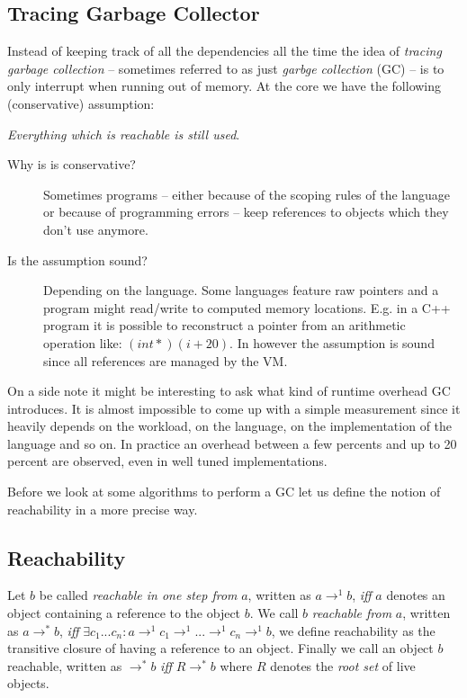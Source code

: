 \subsection{Tracing Garbage Collector}

Instead of keeping track of all the dependencies all the time the idea of \emph{tracing garbage collection} -- sometimes referred to as just \emph{garbge collection} (GC) -- is to only interrupt when running out of memory. At the core we have the following (conservative) assumption:

\emph{Everything which is reachable is still used}.

\begin{description}
  \item[Why is is conservative?] Sometimes programs -- either because of the scoping rules of the language or because of programming errors -- keep references to objects which they don't use anymore.
  \item[Is the assumption sound?] Depending on the language. Some languages feature raw pointers and a program might read/write to computed memory locations. E.g. in a C++ program it is possible to reconstruct a pointer from an arithmetic operation like: $(int*)(i+20)$. In \rift however the assumption is sound since all references are managed by the VM.
\end{description}

On a side note it might be interesting to ask what kind of runtime overhead GC introduces. It is almost impossible to come up with a simple measurement since it heavily depends on the workload, on the language, on the implementation of the language and so on. In practice an overhead between a few percents and up to 20 percent are observed, even in well tuned implementations.

Before we look at some algorithms to perform a GC let us define the notion of reachability in a more precise way.

\subsection{Reachability}

Let $b$ be called \emph{reachable in one step from} $a$, written as $a \rightarrow^{1} b$, \emph{iff} $a$ denotes an object containing a reference to the object $b$. We call $b$ \emph{reachable from} $a$, written as $a \rightarrow^{*} b$, \emph{iff} $\exists c_1 ... c_n : a \rightarrow^{1} c_1 \rightarrow^{1} ... \rightarrow^{1} c_n \rightarrow^{1} b$, \ie we define reachability as the transitive closure of having a reference to an object. Finally we call an object $b$ reachable, written as $\rightarrow^{*} b$ \emph{iff} $R \rightarrow^{*} b$ where $R$ denotes the \emph{root set} of live objects.

